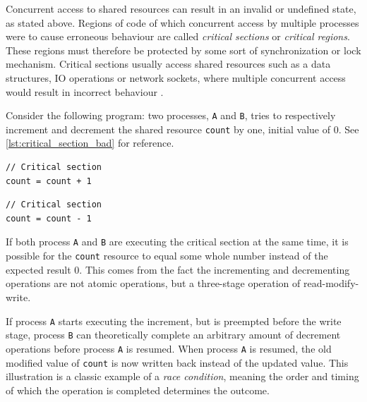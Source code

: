 Concurrent access to shared resources can result in an invalid or undefined state, as stated above. Regions of code of which concurrent access by multiple processes were to cause erroneous behaviour are called \textit{critical sections} or \textit{critical regions}. These regions must therefore be protected by some sort of synchronization or lock mechanism. Critical sections usually access shared resources such as a data structures, IO operations or network sockets, where multiple concurrent access would result in incorrect behaviour \citep{raynal2012concurrent}.

Consider the following program: two processes, \texttt{A} and \texttt{B}, tries to respectively increment and decrement the shared resource \texttt{count} by one, initial value of $0$. See \cref{lst:critical_section_bad} for reference.

\begin{lstfloat}
\noindent\begin{minipage}{0.45\textwidth}
\begin{lstlisting}[title={Process A},style={CustomC},frame={},xleftmargin={4em}]
// Critical section
count = count + 1
\end{lstlisting}
\end{minipage}
\begin{minipage}{0.45\textwidth}
\begin{lstlisting}[title={Process B},style={CustomC},frame={},xleftmargin={4em}]
// Critical section
count = count - 1
\end{lstlisting}
\end{minipage}
\label{lst:critical_section_bad}
\end{lstfloat}

If both process \texttt{A} and \texttt{B} are executing the critical section at the same time, it is possible for the \texttt{count} resource to equal some whole number instead of the expected result $0$. This comes from the fact the incrementing and decrementing operations are not atomic operations, but a three\hyp{}stage operation of read\hyp{}modify\hyp{}write. 

If process \texttt{A} starts executing the increment, but is preempted before the write stage, process \texttt{B} can theoretically complete an arbitrary amount of decrement operations before process \texttt{A} is resumed. When process \texttt{A} is resumed, the old modified value of \texttt{count} is now written back instead of the updated value. This illustration is a classic example of a \textit{race condition}, meaning the order and timing of which the operation is completed determines the outcome.


